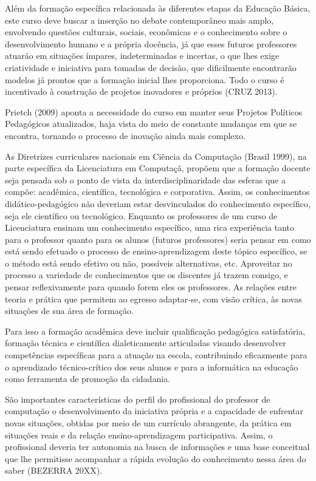 Além da formação específica relacionada às diferentes etapas da Educação Básica, este curso deve buscar a inserção no debate contemporâneo mais amplo, envolvendo questões culturais, sociais, econômicas e o conhecimento sobre o desenvolvimento humano e a própria docência, já que esses futuros professores atuarão em situações ímpares, indeterminadas e incertas, o que lhes exige criatividade e iniciativa para tomadas de decisão, que dificilmente encontrarão modelos já prontos que a formação inicial lhes proporciona. Todo o curso é incentivado à construção de projetos inovadores e próprios (CRUZ 2013).


Prietch (2009) aponta a necessidade do curso em manter seus Projetos Políticos Pedagógicos atualizados, haja vista do meio de constante mudanças em que se encontra, tornando o processo de inovação ainda mais complexo. 


As Diretrizes curriculares nacionais em Ciência da Computação (Brasil 1999), na parte específica da Licenciatura em Computaçã, propõem que a formação docente seja pensada sob o ponto de vista da interdisciplinaridade das esferas que a compõe: acadêmica, científica, tecnológica e corporativa. Assim, os conhecimentos didático-pedagógico não deveriam estar desvinculados do conhecimento específico, seja ele científico ou tecnológico. Enquanto os professores de um curso de Licenciatura ensinam um conhecimento específico, uma rica experiência tanto para o professor quanto para os alunos (futuros professores) seria pensar em como está sendo efetuado o processo de ensino-aprendizagem deste tópico específico, se o método está sendo efetivo ou não, possíveis alternativas, etc. Aproveitar no processo a variedade de conhecimentos que os discentes já trazem consigo, e pensar reflexivamente para quando forem eles os professores. As relações entre teoria e prática que permitem ao egresso adaptar-se, com visão crítica, às novas situações de sua área de formação.


Para isso a formação acadêmica deve incluir qualificação pedagógica satisfatória, formação técnica e científica dialeticamente articuladas visando desenvolver competências específicas para a atuação na escola, contribuindo eficazmente para o aprendizado técnico-crítico dos seus alunos e para a informática na educação como ferramenta de promoção da cidadania.


São importantes características do perfil do profissional do professor de computação o desenvolvimento da iniciativa própria e a capacidade de enfrentar novas situações, obtidas por meio de um currículo abrangente, da prática em situações reais e da relação ensino-aprendizagem participativa. Assim, o profissional deveria ter autonomia na busca de informações e uma base conceitual que lhe permitisse acompanhar a rápida evolução do conhecimento nessa área do saber (BEZERRA 20XX).


